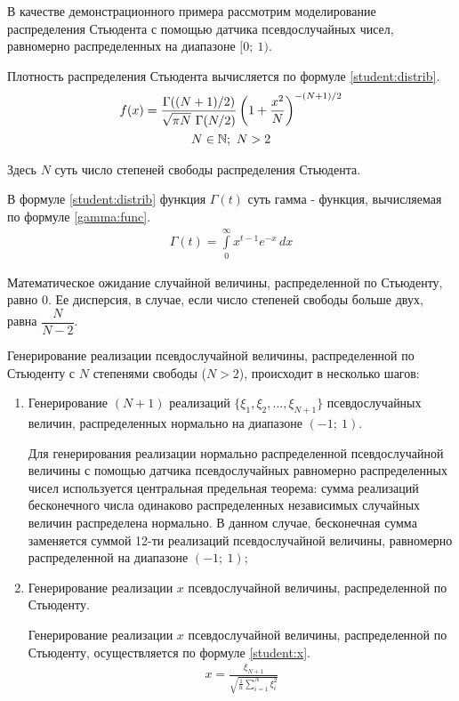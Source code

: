
В качестве демонстрационного примера рассмотрим моделирование распределения Стьюдента с помощью датчика псевдослучайных чисел, равномерно распределенных на диапазоне $[0 ;~ 1)$.

Плотность распределения Стьюдента вычисляется по формуле \eqref{student:distrib}.
\begin{gather}
	f(x) = \frac{\Gamma((N + 1) / 2)}{\sqrt{\pi N} ~ \Gamma(N / 2)} \left( 1 + \frac{x^2}{N} \right) ^{- (N + 1) / 2} \label{student:distrib} \\
	N \in \mathbb{N} ;~ N > 2 \notag 
\end{gather}

Здесь $N$ суть число степеней свободы распределения Стьюдента. 

В формуле \eqref{student:distrib} функция $\Gamma(t)$ суть гамма - функция, вычисляемая по формуле \eqref{gamma:func}.
\begin{gather}
	\Gamma(t) = \int \limits_0^{\infty} x^{t - 1} e^{-x} \, dx \label{gamma:func}
\end{gather}

Математическое ожидание случайной величины, распределенной по Стьюденту, равно 0. Ее дисперсия, в случае, если число степеней свободы больше двух, равна $\dfrac{N}{N - 2}$.

Генерирование реализации псевдослучайной величины, распределенной по Стьюденту с $N$ степенями свободы ($N > 2$), происходит в несколько шагов:

\begin{enumerate}

	\item Генерирование $(N + 1)$ реализаций $\{\xi_1, \xi_2, ..., \xi_{N + 1}\}$ псевдослучайных величин, распределенных нормально на диапазоне $(-1 ;~ 1)$.

	Для генерирования реализации нормально распределенной псевдослучайной величины с помощью датчика псевдослучайных равномерно распределенных чисел используется центральная предельная теорема: сумма реализаций бесконечного числа одинаково распределенных независимых случайных величин распределена нормально. В данном случае, бесконечная сумма заменяется суммой 12-ти реализаций псевдослучайной величины, равномерно распределенной на диапазоне $(-1 ;~ 1)$;
	
	\item Генерирование реализации $x$ псевдослучайной величины, распределенной по Стьюденту.

	Генерирование реализации $x$ псевдослучайной величины, распределенной по Стьюденту, осуществляется по формуле \eqref{student:x}.
	\begin{gather}
		x = \frac{\xi_{N + 1}}{\sqrt{\frac{1}{n}\sum \limits_{i = 1}^N \xi_i^2}} \label{student:x}
	\end{gather}

\end{enumerate}

